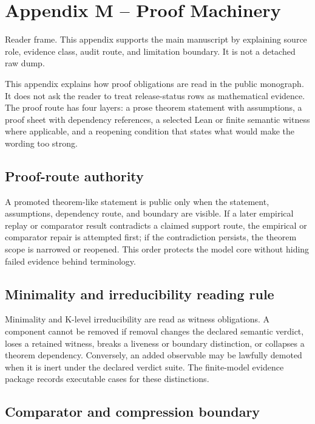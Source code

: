 \section{Appendix M -- Proof Machinery}
Reader frame. This appendix supports the main manuscript by explaining source role, evidence class, audit route, and limitation boundary. It is not a detached raw dump.


\label{sec:oc13-proof-machinery-appendix}

This appendix explains how proof obligations are read in the public monograph. It does not ask the reader to treat release-status rows as mathematical evidence. The proof route has four layers: a prose theorem statement with assumptions, a proof sheet with dependency references, a selected Lean or finite semantic witness where applicable, and a reopening condition that states what would make the wording too strong.


\subsection{Proof-route authority}

A promoted theorem-like statement is public only when the statement, assumptions, dependency route, and boundary are visible. If a later empirical replay or comparator result contradicts a claimed support route, the empirical or comparator repair is attempted first; if the contradiction persists, the theorem scope is narrowed or reopened. This order protects the model core without hiding failed evidence behind terminology.


\subsection{Minimality and irreducibility reading rule}

Minimality and K-level irreducibility are read as witness obligations. A component cannot be removed if removal changes the declared semantic verdict, loses a retained witness, breaks a liveness or boundary distinction, or collapses a theorem dependency. Conversely, an added observable may be lawfully demoted when it is inert under the declared verdict suite. The finite-model evidence package records executable cases for these distinctions.


\subsection{Comparator and compression boundary}


